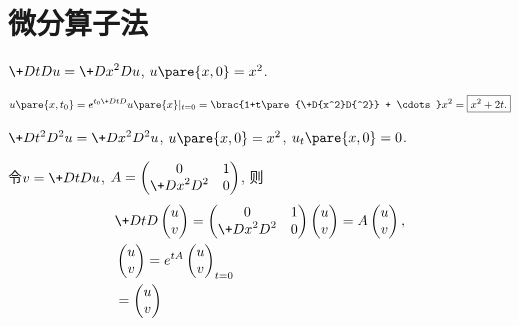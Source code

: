 \documentclass[hidelinks]{ctexart}
\begin{document}
\section{微分算子法} %
\label{sec:微分算子法}

\begin{ex}
    $\displaystyle \+DtDu = \+D{x^2}D{u}$, $u\pare{x,0} = x^2$.
\end{ex}
\begin{solution}
    $\displaystyle u\pare{x,t_0} = e^{t_0\+DtD{}}u\pare{x}\vert_{t=0} = \brac{1+t\pare{\+D{x^2}D{^2}} + \cdots} x^2 = \boxed{x^2 + 2t.}$
\end{solution}
\begin{ex}
    $\displaystyle \+D{t^2}D{^2 u} = \+D{x^2}D{^2u}$, $u\pare{x,0} = x^2$, $u_t\pare{x,0} = 0$.
\end{ex}
\begin{solution}
    令$\displaystyle v = \+DtDu$, $\displaystyle A = \begin{pmatrix}
        0 & 1 \\
        \displaystyle \+D{x^2}D{^2} & 0
    \end{pmatrix}$, 则
    \begin{align*}
        & \+DtD{}\begin{pmatrix}
            u \\ v
        \end{pmatrix} = \begin{pmatrix}
            0 & 1 \\
            \displaystyle \+D{x^2}D{^2} & 0
        \end{pmatrix}\begin{pmatrix}
            u \\ v
        \end{pmatrix} = A \begin{pmatrix}
            u \\ v
        \end{pmatrix}, \\
        & \begin{pmatrix}
            u \\ v
        \end{pmatrix} = e^{tA}\begin{pmatrix}
            u \\ v
        \end{pmatrix}_{t=0} \\ &= \begin{pmatrix}
            u \\ v

\end{pmatrix}
\end{align*}
\end{solution}
\end{document}
